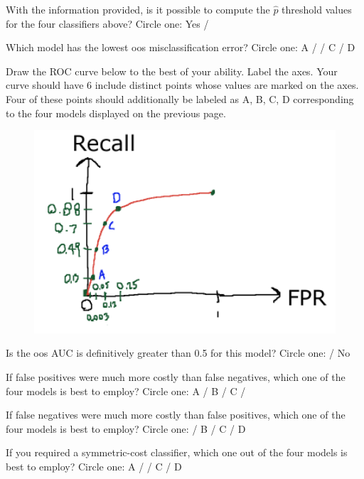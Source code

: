 \documentclass[12pt]{article}
\begin{document}
 With the information provided, is it possible to compute the $\hat{p}$ threshold values for the four classifiers above? Circle one: Yes / 


 Which model has the lowest oos misclassification error? Circle one: A /  / C / D

 Draw the ROC curve below to the best of your ability. Label the axes. Your curve should have 6 include distinct points whose values are marked on the axes. Four of these points should additionally be labeled as A, B, C, D corresponding to the four models displayed on the previous page. 

 
\begin{figure}[htp]
\centering
\includegraphics[width=5in]{roc}
\end{figure} 




 Is the oos AUC is definitively greater than 0.5 for this model? Circle one:  / No

 If false positives were much more costly than false negatives, which one of the four models is best to employ? Circle one: A / B / C / 

 If false negatives were much more costly than false positives, which one of the four models is best to employ? Circle one:  / B / C / D

 If you required a symmetric-cost classifier, which one out of the four models is best to employ? Circle one: A /  / C / D
\end{document}
